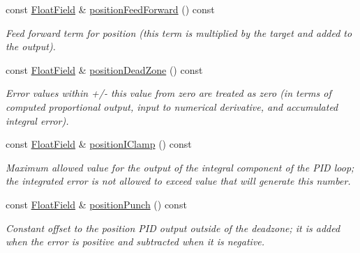 \begin{DoxyCompactItemize}
const \hyperlink{classhebi_1_1Info_1_1FloatField}{Float\+Field} \& \hyperlink{classhebi_1_1Info_1_1Settings_1_1Actuator_1_1PositionGains_a9a7c5ccc37def3ed46f552744aa51c75}{position\+Feed\+Forward} () const
\begin{DoxyCompactList}\small\item\em Feed forward term for position (this term is multiplied by the target and added to the output). \end{DoxyCompactList}\item 
\mbox{\label{classhebi_1_1Info_1_1Settings_1_1Actuator_1_1PositionGains_ad322f7af0a7d6599a05b84dcf7d0e23a}} 
const \hyperlink{classhebi_1_1Info_1_1FloatField}{Float\+Field} \& \hyperlink{classhebi_1_1Info_1_1Settings_1_1Actuator_1_1PositionGains_ad322f7af0a7d6599a05b84dcf7d0e23a}{position\+Dead\+Zone} () const
\begin{DoxyCompactList}\small\item\em Error values within +/-\/ this value from zero are treated as zero (in terms of computed proportional output, input to numerical derivative, and accumulated integral error). \end{DoxyCompactList}\item 
\mbox{\label{classhebi_1_1Info_1_1Settings_1_1Actuator_1_1PositionGains_ab9f489e39ac100bc7531eef55ff6f017}} 
const \hyperlink{classhebi_1_1Info_1_1FloatField}{Float\+Field} \& \hyperlink{classhebi_1_1Info_1_1Settings_1_1Actuator_1_1PositionGains_ab9f489e39ac100bc7531eef55ff6f017}{position\+I\+Clamp} () const
\begin{DoxyCompactList}\small\item\em Maximum allowed value for the output of the integral component of the P\+ID loop; the integrated error is not allowed to exceed value that will generate this number. \end{DoxyCompactList}\item 
\mbox{\label{classhebi_1_1Info_1_1Settings_1_1Actuator_1_1PositionGains_aade6d56182fd89f8ebe5b65da2780e09}} 
const \hyperlink{classhebi_1_1Info_1_1FloatField}{Float\+Field} \& \hyperlink{classhebi_1_1Info_1_1Settings_1_1Actuator_1_1PositionGains_aade6d56182fd89f8ebe5b65da2780e09}{position\+Punch} () const
\begin{DoxyCompactList}\small\item\em Constant offset to the position P\+ID output outside of the deadzone; it is added when the error is positive and subtracted when it is negative. \end{DoxyCompactList}\item 

\end{DoxyCompactItemize}
